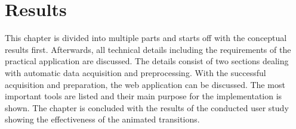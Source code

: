 \section{Results}
\label{s:results}
This chapter is divided into multiple parts and starts off with the conceptual results first. Afterwards, all technical details including the requirements of the practical application are discussed. The details consist of two sections dealing with automatic data acquisition and preprocessing. With the successful acquisition and preparation, the web application can be discussed. The most important tools are listed and their main purpose for the implementation is shown. The chapter is concluded with the results of the conducted user study showing the effectiveness of the animated transitions.


